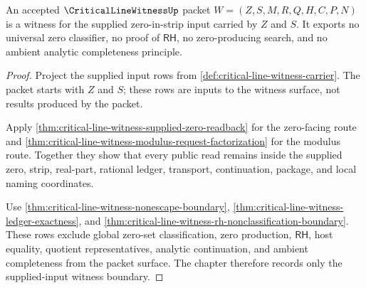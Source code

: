 \begin{theorem}
\label{thm:critical-line-witness-rh-nonproof-boundary}
An accepted $\CriticalLineWitnessUp$ packet $W=(Z,S,M,R,Q,H,C,P,N)$ is a witness for the supplied zero-in-strip input carried by $Z$ and $S$. It exports no universal zero classifier, no proof of $\mathsf{RH}$, no zero-producing search, and no ambient analytic completeness principle.
\end{theorem}
\begin{proof}
Project the supplied input rows from \autoref{def:critical-line-witness-carrier}. The packet starts with $Z$ and $S$; these rows are inputs to the witness surface, not results produced by the packet.

Apply \autoref{thm:critical-line-witness-supplied-zero-readback} for the zero-facing route and \autoref{thm:critical-line-witness-modulus-request-factorization} for the modulus route. Together they show that every public read remains inside the supplied zero, strip, real-part, rational ledger, transport, continuation, package, and local naming coordinates.

Use \autoref{thm:critical-line-witness-nonescape-boundary}, \autoref{thm:critical-line-witness-ledger-exactness}, and \autoref{thm:critical-line-witness-rh-nonclassification-boundary}. These rows exclude global zero-set classification, zero production, $\mathsf{RH}$, host equality, quotient representatives, analytic continuation, and ambient completeness from the packet surface. The chapter therefore records only the supplied-input witness boundary.
\end{proof}

